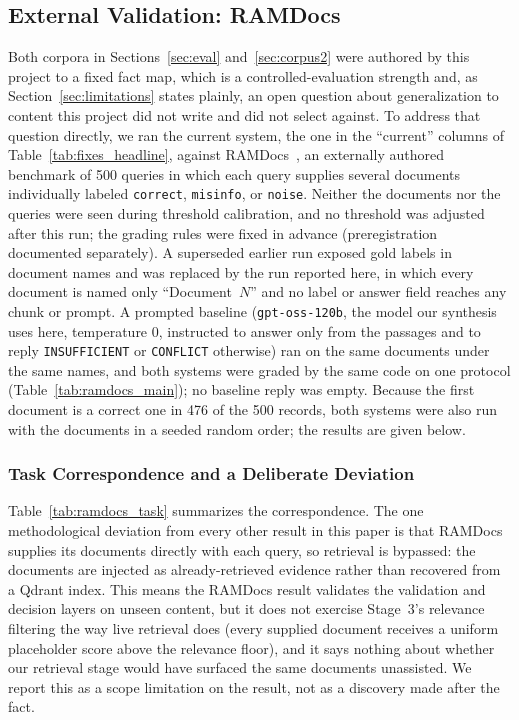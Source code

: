 \documentclass[conference]{IEEEtran}
\begin{document}
\subsection{External Validation: RAMDocs}
\label{sec:ramdocs}
Both corpora in Sections~\ref{sec:eval} and~\ref{sec:corpus2} were authored by
this project to a fixed fact map, which is a controlled-evaluation strength
and, as Section~\ref{sec:limitations} states plainly, an open question about
generalization to content this project did not write and did not select
against. To address that question directly, we ran the current system,
the one in the ``current'' columns of Table~\ref{tab:fixes_headline}, against
RAMDocs~\cite{wang2025ramdocs}, an externally authored benchmark of 500
queries in which each query supplies several documents individually labeled
\texttt{correct}, \texttt{misinfo}, or \texttt{noise}. Neither the documents
nor the queries were seen during threshold calibration, and no threshold was
adjusted after this run; the grading rules were fixed in advance
(preregistration documented separately). A superseded earlier run exposed
gold labels in document names and was replaced by the run reported here, in
which every document is named only ``Document~$N$'' and no label or answer
field reaches any chunk or prompt. A prompted baseline (\texttt{gpt-oss-120b},
the model our synthesis uses here, temperature 0, instructed to answer only
from the passages and to reply \texttt{INSUFFICIENT} or \texttt{CONFLICT}
otherwise) ran on the same documents under the same names, and both systems
were graded by the same code on one protocol (Table~\ref{tab:ramdocs_main});
no baseline reply was empty. Because the first document is a correct one in
476 of the 500 records, both systems were also run with the documents in a
seeded random order; the results are given below.

\subsubsection{Task Correspondence and a Deliberate Deviation}
Table~\ref{tab:ramdocs_task} summarizes the correspondence. The one
methodological deviation from every other result in this paper is that
RAMDocs supplies its documents directly with each query, so retrieval is
bypassed: the documents are injected as already-retrieved evidence rather
than recovered from a Qdrant index. This means the RAMDocs result validates
the validation and decision layers on unseen content, but it does not
exercise Stage~3's relevance filtering the way live retrieval does (every
supplied document receives a uniform placeholder score above the relevance
floor), and it says nothing about whether our retrieval stage would have
surfaced the same documents unassisted. We report this as a scope
limitation on the result, not as a discovery made after the fact.
\end{document}
